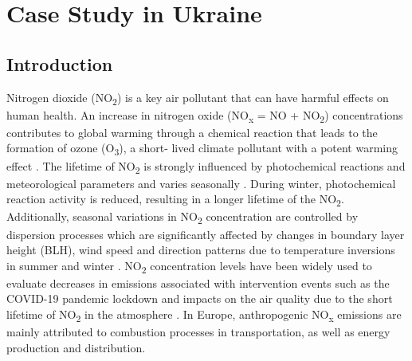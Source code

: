\section{Case Study in Ukraine} \label{chap3_s1}

\subsection{Introduction}
Nitrogen dioxide (NO\textsubscript{2}) is a key air pollutant that can have harmful effects on human health. An increase in nitrogen oxide (NO\textsubscript{x} = NO + NO\textsubscript{2}) concentrations contributes to global warming through a chemical reaction that leads to the formation of ozone (O\textsubscript{3}), a short- lived climate pollutant with a potent warming effect \citep{ipcc2013}. The lifetime of NO\textsubscript{2} is strongly influenced by photochemical reactions and meteorological parameters \citep{barre2021estimating} and varies seasonally \citep{dragomir2015modeling,kendrick2015diurnal}. During winter, photochemical reaction activity is reduced, resulting in a longer lifetime of the NO\textsubscript{2}. Additionally, seasonal variations in NO\textsubscript{2} concentration are controlled by dispersion processes which are significantly affected by changes in boundary layer height (BLH), wind speed and direction patterns due to temperature inversions in summer and winter \citep{barre2021estimating,kendrick2015diurnal}. NO\textsubscript{2} concentration levels have been widely used to evaluate decreases in emissions associated with intervention events such as the COVID-19 pandemic lockdown and impacts on the air quality due to the short lifetime of NO\textsubscript{2} in the atmosphere \citep{barre2021estimating,cooper2022global}.
In Europe, anthropogenic NO\textsubscript{x} emissions are mainly attributed to combustion processes in transportation, as well as energy production and distribution. \par
